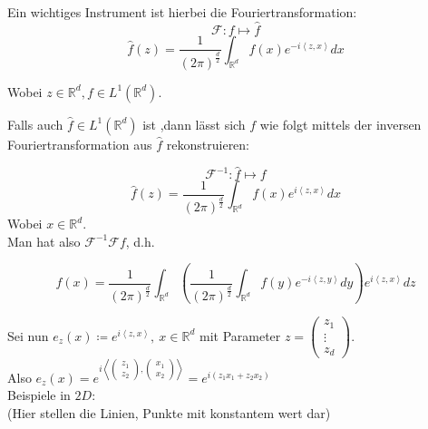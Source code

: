 \documentclass[ngerman]{article}
\theoremstyle{plain}
\theoremstyle{definition}
\numberwithin{equation}{section}
\newcommand{\skprod}[2]{
\left \langle #1,#2 \right \rangle
}
\newcommand{\R}[0] {
\mathbb R
}
\newcommand{\srmatrix}[1] {
\left( \begin{smallmatrix} #1 \end{smallmatrix} \right)
}
\newcommand{\x}[0] {
  \boldsymbol{x}
}
\begin{document}
    Ein wichtiges Instrument ist hierbei die Fouriertransformation:
    \[\mathcal F : f \mapsto \hat f\]
    \begin{equation}
        \boxed{\hat f(z) = \frac{1}{(2 \pi)^\frac{d}{2}} \int_{\R^d} f(x) e^{-i \skprod{z}{x}} dx}
    \end{equation}

    Wobei  $z \in \R^d, f \in L^1(\R^d)$.

    Falls auch $\hat f \in L^1(\R^d)$ ist ,dann lässt sich $f$ wie folgt mittels der inversen Fouriertransformation aus $\hat f$ rekonstruieren:

    \[\mathcal F^{-1} : \hat f \mapsto f\]
    \begin{equation}
        \boxed{\hat f(z) = \frac{1}{(2 \pi)^\frac{d}{2}} \int_{\R^d} f(x) e^{i \skprod{z}{x}} dx}
    \end{equation}
    Wobei $x \in \R^d$.\\

    Man hat also $\mathcal F^{-1} \mathcal F f$, d.h.

    \[f(x) = \frac{1}{(2 \pi)^\frac{d}{2}} \int_{\R^d} \left(\frac{1}{(2 \pi)^\frac{d}{2}} \int_{\R^d} f(y) e^{-i \skprod{z}{y}} dy\right) e^{i \skprod{z}{x}} dz\]

    Sei nun $e_z(x)  \coloneqq  e^{i \skprod{z}{x}}, \ x \in \R^d$ mit Parameter
$z = \srmatrix{z_1 \\ \vdots \\ z_d}$.\\
    Also $e_z(x) = e^{i\skprod{\srmatrix{z_1\\z_2}}{\srmatrix{x_1\\x_2}}} = e^{i (z_1 x_1 +z_2 x_2)}$\\
    Beispiele in $2D$:\\
    (Hier stellen die Linien, Punkte mit konstantem wert dar)
\end{document}
